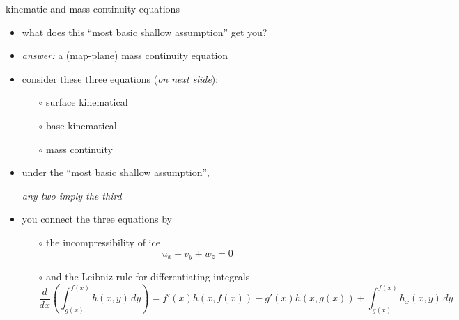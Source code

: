 \begin{frame}{kinematic and mass continuity equations}

\begin{itemize}
\item what does this ``most basic shallow assumption'' get you?
\item \emph{answer:} a (map-plane) mass continuity equation
\item consider these three equations (\emph{on next slide}):
  \begin{itemize}
  \item[$\circ$]  surface kinematical
  \item[$\circ$]  base kinematical
  \item[$\circ$]  mass continuity
  \end{itemize}
\item under the ``most basic shallow assumption'', 

\begin{center}\emph{any two imply the third}\end{center}
\item you connect the three equations by
  \begin{itemize}
  \item[$\circ$]  the incompressibility of ice
    $$u_x + v_y + w_z = 0$$
  \item[$\circ$]  and the Leibniz rule for differentiating integrals
  \scriptsize
    $$\frac{d}{dx}\left(\int_{g(x)}^{f(x)} h(x,y)\,dy\right) = f'(x) h(x,f(x)) - g'(x) h(x,g(x)) + \int_{g(x)}^{f(x)} h_x(x,y)\,dy$$
  \end{itemize}
\end{itemize}
\end{frame}



